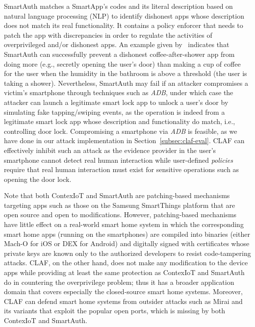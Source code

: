 \documentclass[letterpaper,12pt]{article}
\begin{document}
SmartAuth matches a SmartApp's codes and its literal description based on natural language processing (NLP) to identify dishonest apps whose description does not match its real functionality. It contains a policy enforcer that needs to patch the app with discrepancies in order to regulate the activities of overprivileged and/or dishonest apps. An example given by~\cite{tian2017smartauth} indicates that SmartAuth can successfully prevent a  dishonest coffee-after-shower app from doing more (e.g., secretly opening the user's door) than making a cup of coffee for the user when the humidity in the bathroom is above a threshold (the user is taking a shower). Nevertheless, SmartAuth may fail if an attacker compromises a victim's smartphone through techniques such as \textit{ADB}, under which case the attacker can launch a legitimate smart lock app to unlock a user's door by simulating fake tapping/swiping events, as the operation is indeed from a legitimate smart lock app whose description and functionality do match, i.e., controlling door lock. Compromising a smartphone via \textit{ADB} is feasible, as we have done in our attack implementation in Section~\ref{subsec:claf-eval}. CLAF can effectively inhibit such an attack as the evidence provider in the user's smartphone cannot detect real human interaction while user-defined \textit{policies} require that real human interaction must exist for sensitive operations such as opening the door lock. %

Note that both ContexIoT and SmartAuth are patching-based mechanisms targeting apps such as those on the Samsung SmartThings platform that are open source and open to modifications. However, patching-based mechanisms have little effect on a real-world smart home system in which the corresponding smart home apps (running on the smartphones) are compiled into binaries (either Mach-O for iOS or DEX for Android) and digitally signed with certificates whose private keys are known only to the authorized developers to resist code-tampering attacks. 
CLAF, on the other hand, does not make any modification to the device apps while providing at least the same protection as ContexIoT and SmartAuth do in countering the overprivilege problem; thus it has a broader application domain that covers especially the closed-source smart home systems. Moreover, CLAF can defend smart home systems from outsider attacks such as Mirai and its variants that exploit the popular open ports, which is missing by both ContexIoT and SmartAuth.
\end{document}
